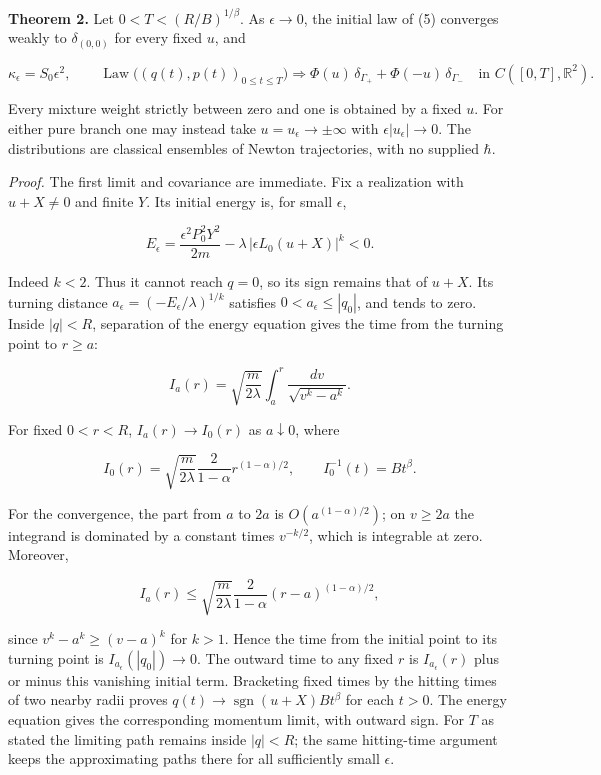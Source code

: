 \documentclass[11pt,a4paper]{article}
\begin{document}
\textbf{Theorem 2.} Let \(0<T<(R/B)^{1/\beta}\). As \(\epsilon\to0\),
the initial law of (5) converges weakly to \(\delta_{(0,0)}\) for every
fixed \(u\), and

\[
 \kappa_\epsilon=S_0\epsilon^2,\qquad
 \operatorname{Law}\bigl((q(t),p(t))_{0\le t\le T}\bigr)
 \Longrightarrow
 \Phi(u)\,\delta_{\Gamma_+}+\Phi(-u)\,\delta_{\Gamma_-}
 \quad\text{in }C([0,T],\mathbb R^2). \tag{6}
\]

Every mixture weight strictly between zero and one is obtained by a
fixed \(u\). For either pure branch one may instead take
\(u=u_\epsilon\to\pm\infty\) with \(\epsilon|u_\epsilon|\to0\). The
distributions are classical ensembles of Newton trajectories, with no
supplied \(\hbar\).

\emph{Proof.} The first limit and covariance are immediate. Fix a
realization with \(u+X\ne0\) and finite \(Y\). Its initial energy is,
for small \(\epsilon\),

\[
 E_\epsilon=\frac{\epsilon^2P_0^2Y^2}{2m}
            -\lambda\,|\epsilon L_0(u+X)|^k<0. \tag{7}
\]

Indeed \(k<2\). Thus it cannot reach \(q=0\), so its sign remains that
of \(u+X\). Its turning distance
\(a_\epsilon=(-E_\epsilon/\lambda)^{1/k}\) satisfies
\(0<a_\epsilon\le|q_0|\), and tends to zero. Inside \(|q|<R\),
separation of the energy equation gives the time from the turning point
to \(r\ge a\):

\[
 I_a(r)=\sqrt{\frac{m}{2\lambda}}\int_a^r
              \frac{dv}{\sqrt{v^k-a^k}}. \tag{8}
\]

For fixed \(0<r<R\), \(I_a(r)\to I_0(r)\) as \(a\downarrow0\), where

\[
 I_0(r)=\sqrt{\frac{m}{2\lambda}}\frac{2}{1-\alpha}
                    r^{(1-\alpha)/2},\qquad I_0^{-1}(t)=Bt^\beta.
 \tag{9}
\]

For the convergence, the part from \(a\) to \(2a\) is
\(O(a^{(1-\alpha)/2})\); on \(v\ge2a\) the integrand is dominated by a
constant times \(v^{-k/2}\), which is integrable at zero. Moreover,

\[
 I_a(r)\le \sqrt{\frac{m}{2\lambda}}\frac{2}{1-\alpha}
                 (r-a)^{(1-\alpha)/2}, \tag{10}
\]

since \(v^k-a^k\ge(v-a)^k\) for \(k>1\). Hence the time from the initial
point to its turning point is \(I_{a_\epsilon}(|q_0|)\to0\). The outward
time to any fixed \(r\) is \(I_{a_\epsilon}(r)\) plus or minus this
vanishing initial term. Bracketing fixed times by the hitting times of
two nearby radii proves \(q(t)\to\operatorname{sgn}(u+X)Bt^\beta\) for
each \(t>0\). The energy equation gives the corresponding momentum
limit, with outward sign. For \(T\) as stated the limiting path remains
inside \(|q|<R\); the same hitting-time argument keeps the approximating
paths there for all sufficiently small \(\epsilon\).
\end{document}
